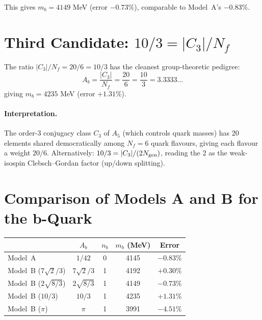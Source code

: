 \documentclass[11pt]{article}
\begin{document}
This gives $m_b = 4149$ MeV (error $-0.73\%$), comparable to
Model~A's $-0.83\%$.

\section{Third Candidate: $10/3 = |C_3|/N_f$}

The ratio $|C_3|/N_f = 20/6 = 10/3$ has the cleanest group-theoretic
pedigree:
\begin{equation}
  A_b = \frac{|C_3|}{N_f} = \frac{20}{6} = \frac{10}{3} = 3.3333\ldots
\end{equation}
giving $m_b = 4235$ MeV (error $+1.31\%$).

\paragraph{Interpretation.}  The order-3 conjugacy class $C_3$ of $A_5$
(which controls quark masses) has 20 elements shared democratically
among $N_f = 6$ quark flavours, giving each flavour a weight $20/6$.
Alternatively: $10/3 = |C_3|/(2N_{\rm gen})$, reading the 2 as the
weak-isospin Clebsch--Gordan factor (up/down splitting).

\section{Comparison of Models A and B for the b-Quark}

\begin{center}
\begin{tabular}{lcccc}
\toprule
 & $A_b$ & $n_b$ & $m_b$ (MeV) & Error \\
\midrule
Model~A & $1/42$ & 0 & 4145 & $-0.83\%$ \\
Model~B ($7\sqrt{2}/3$) & $7\sqrt{2}/3$ & 1 & 4192 & $+0.30\%$ \\
Model~B ($2\sqrt{8/3}$) & $2\sqrt{8/3}$ & 1 & 4149 & $-0.73\%$ \\
Model~B ($10/3$) & $10/3$ & 1 & 4235 & $+1.31\%$ \\
Model~B ($\pi$) & $\pi$ & 1 & 3991 & $-4.51\%$ \\
\bottomrule
\end{tabular}
\end{center}
\end{document}
